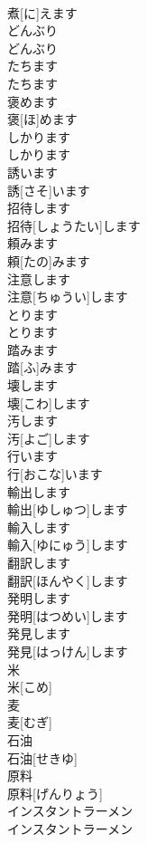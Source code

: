 \documentclass[8pt]{extreport}
\begin{document}
\begin{CJK}{UTF8}{min}
\\	煮[に]えます	
\\	どんぶり	
\\	どんぶり	
\\	たちます	
\\	たちます	
\\	褒めます	
\\	褒[ほ]めます	
\\	しかります	
\\	しかります	
\\	誘います	
\\	誘[さそ]います	
\\	招待します	
\\	招待[しょうたい]します	
\\	頼みます	
\\	頼[たの]みます	
\\	注意します	
\\	注意[ちゅうい]します	
\\	とります	
\\	とります	
\\	踏みます	
\\	踏[ふ]みます	
\\	壊します	
\\	壊[こわ]します	
\\	汚します	
\\	汚[よご]します	
\\	行います	
\\	行[おこな]います	
\\	輸出します	
\\	輸出[ゆしゅつ]します	
\\	輸入します	
\\	輸入[ゆにゅう]します	
\\	翻訳します	
\\	翻訳[ほんやく]します	
\\	発明します	
\\	発明[はつめい]します	
\\	発見します	
\\	発見[はっけん]します	
\\	米	
\\	米[こめ]	
\\	麦	
\\	麦[むぎ]	
\\	石油	
\\	石油[せきゆ]	
\\	原料	
\\	原料[げんりょう]	
\\	インスタントラーメン	
\\	インスタントラーメン	

\end{CJK}
\end{document}
